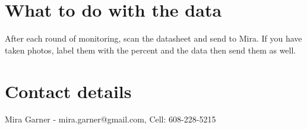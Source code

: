 \documentclass[11pt,letter]{article}
\begin{document}
\section{What to do with the data}
After each round of monitoring, scan the datasheet and send to Mira. If you have taken photos, label them with the percent and the data then send them as well.

\section{Contact details}
Mira Garner - mira.garner@gmail.com, Cell: 608-228-5215
\end{document}
